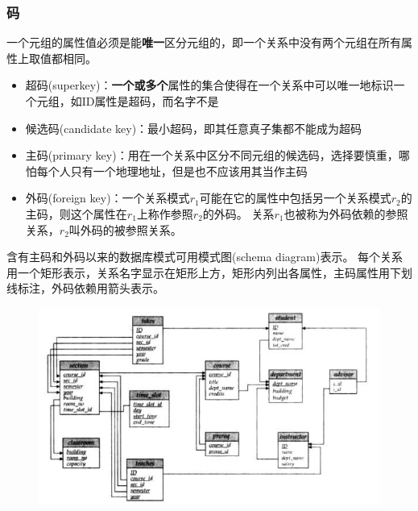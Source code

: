 \subsubsection{码}
一个元组的属性值必须是能\textbf{唯一}区分元组的，即一个关系中没有两个元组在所有属性上取值都相同。
\begin{itemize}
\item 超码(superkey)：\textbf{一个或多个}属性的集合使得在一个关系中可以唯一地标识一个元组，如ID属性是超码，而名字不是
\item 候选码(candidate key)：最小超码，即其任意真子集都不能成为超码
\item 主码(primary key)：用在一个关系中区分不同元组的候选码，选择要慎重，哪怕每个人只有一个地理地址，但是也不应该用其当作主码
\item 外码(foreign key)：一个关系模式$r_1$可能在它的属性中包括另一个关系模式$r_2$的主码，则这个属性在$r_1$上称作参照$r_2$的外码。
关系$r_1$也被称为外码依赖的参照关系，$r_2$叫外码的被参照关系。
\end{itemize}

含有主码和外码以来的数据库模式可用模式图(schema diagram)表示。
每个关系用一个矩形表示，关系名字显示在矩形上方，矩形内列出各属性，主码属性用下划线标注，外码依赖用箭头表示。
\begin{figure}[H]
\centering
\includegraphics[width=0.8\linewidth]{fig/university_schema_diagram.png}
\end{figure}